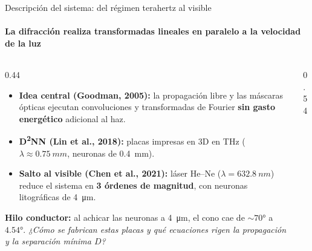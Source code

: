 \documentclass[aspectratio=169,10pt]{beamer}
\begin{document}
\begin{frame}{Descripción del sistema: del régimen terahertz al visible}
\framesubtitle{La difracción realiza transformadas lineales en paralelo a la velocidad de la luz}
\begin{columns}[T,onlytextwidth]
  \begin{column}{0.44\textwidth}
    \footnotesize
    \begin{itemize}\setlength\itemsep{2.5pt}
      \item \textbf{Idea central (Goodman, 2005):} la propagación libre y las máscaras ópticas ejecutan convoluciones y transformadas de Fourier \textbf{sin gasto energético} adicional al haz.
      \item \textbf{D\textsuperscript{2}NN (Lin et al., 2018):} placas impresas en 3D en THz ($\lambda\approx\SI{0.75}{mm}$, neuronas de \SI{0.4}{mm}).
      \item \textbf{Salto al visible (Chen et al., 2021):} láser He--Ne ($\lambda=\SI{632.8}{nm}$) reduce el sistema en \textbf{3 órdenes de magnitud}, con neuronas litográficas de \SI{4}{\micro m}.
    \end{itemize}
    \vspace{2pt}
    \begin{destacado}
      \footnotesize\textbf{Hilo conductor:} al achicar las neuronas a \SI{4}{\micro m}, el cono cae de $\sim\ang{70}$ a $\ang{4.54}$. \emph{¿Cómo se fabrican estas placas y qué ecuaciones rigen la propagación y la separación mínima $D$?}
    \end{destacado}
  \end{column}
  \begin{column}{0.54\textwidth}
    \centering
\end{column}
\end{columns}
\end{frame}
\end{document}
